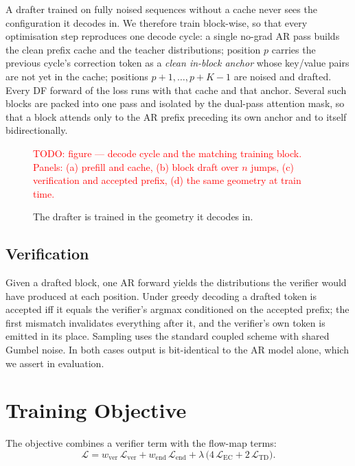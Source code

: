 \documentclass{zapiski}
\newcommand{\cm}[1]{\textcolor{red}{#1}}
\begin{document}
A drafter trained on fully noised sequences without a cache never sees the
configuration it decodes in. We therefore train block-wise, so that every
optimisation step reproduces one decode cycle: a single no-grad AR pass builds
the clean prefix cache and the teacher distributions; position $p$ carries the
previous cycle's correction token as a \emph{clean in-block anchor} whose
key/value pairs are not yet in the cache; positions $p+1,\dots,p+K-1$ are
noised and drafted. Every DF forward of the loss runs with that cache and that
anchor. Several such blocks are packed into one pass and isolated by the
dual-pass attention mask, so that a block attends only to the AR prefix
preceding its own anchor and to itself bidirectionally.

\begin{figure}[!tbh]
    \centering
    \cm{TODO: figure --- decode cycle and the matching training block.
    Panels: (a) prefill and cache, (b) block draft over $n$ jumps,
    (c) verification and accepted prefix, (d) the same geometry at train time.}
    \caption{The drafter is trained in the geometry it decodes in.}
    \label{fig:model}
\end{figure}

\subsection{Verification}

Given a drafted block, one AR forward yields the distributions the verifier
would have produced at each position. Under greedy decoding a drafted token is
accepted iff it equals the verifier's argmax conditioned on the accepted
prefix; the first mismatch invalidates everything after it, and the verifier's
own token is emitted in its place. Sampling uses the standard coupled scheme
with shared Gumbel noise. In both cases output is bit-identical to the AR model
alone, which we assert in evaluation.

\section{Training Objective}
\label{sec:objective}

The objective combines a verifier term with the flow-map terms:
\begin{equation}
\label{eq:loss}
\mathcal{L} =
  w_{\mathrm{ver}}\,\mathcal{L}_{\mathrm{ver}}
+ w_{\mathrm{end}}\,\mathcal{L}_{\mathrm{end}}
+ \lambda\,\bigl(4\,\mathcal{L}_{\mathrm{EC}} + 2\,\mathcal{L}_{\mathrm{TD}}\bigr).
\end{equation}
\end{document}
